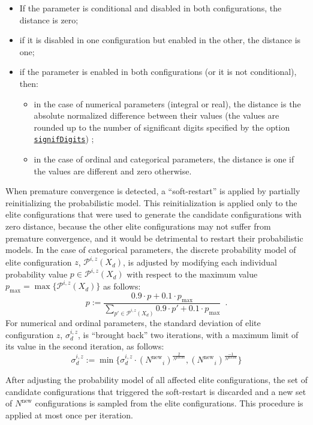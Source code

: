 \documentclass[a4paper]{article}
\newcommand{\assign}{\ensuremath{:=}}
\newcommand{\iter}{\ensuremath{i}\xspace}
\newcommand{\Nparam}{\ensuremath{{N^\text{param}}}\xspace}
\newcommand{\Nnew}{\ensuremath{N^\text{new}}\xspace}
\newcommand{\parameter}[1]{\hyperlink{opt:#1}{\texttt{#1}}}
\begin{document}
\begin{itemize}
\item If the parameter is conditional and disabled in both configurations, the distance is zero;
\item if it is disabled in one configuration but enabled in the other,
  the distance is one;
\item if the parameter is enabled in both configurations (or it is not conditional), then: 

  \begin{itemize}
  \item in the case of numerical parameters (integral or real), the
  distance is the absolute normalized difference between
  their values (the values are rounded up to the number of significant digits specified by the option \parameter{signifDigits}) ;
\item in the case of ordinal and categorical parameters, the distance
  is one if the values are different and zero otherwise.
\end{itemize}
\end{itemize}

When premature convergence is detected, a ``soft-restart'' is applied
by partially reinitializing the probabilistic model. This
reinitialization is applied only to the elite configurations that were
used to generate the candidate configurations with zero distance,
because the other elite configurations may not suffer from premature
convergence, and it would be detrimental to restart their
probabilistic models. In the case of categorical parameters, the
discrete probability model of elite configuration $z$,
$\mathcal{P}^{\iter,z}(X_d)$, is adjusted by modifying each individual
probability value $p \in \mathcal{P}^{\iter,z}(X_d)$ with respect to
the maximum value $p_\text{max} = \max\{\mathcal{P}^{\iter,z}(X_d)\}$
as follows:
%
\[p \assign \frac{0.9 \cdot p + 0.1 \cdot p_\text{max}}{\sum_{p' \in \mathcal{P}^{\iter,z}(X_d)} 0.9 \cdot p' + 0.1 \cdot p_\text{max}}\enspace.\]
%
For numerical and ordinal parameters, the standard deviation of elite configuration $z$, $\sigma_d^{\iter,z}$, is ``brought back'' two iterations, with a maximum limit of its value in the second iteration, as follows:
\[
  \sigma_d^{\iter,z} \assign \min\{ \sigma_d^{\iter,z} \cdot {(\Nnew_i)}^{\frac{2}{\Nparam}},
{(\Nnew_i)}^{\frac{-1}{\Nparam}}\}
\]

After adjusting the probability model of all affected elite
configurations, the set of candidate configurations that triggered the
soft-restart is discarded and a new set of $\Nnew$ configurations is
sampled from the elite configurations. This procedure is applied at
most once per iteration.
\end{document}
